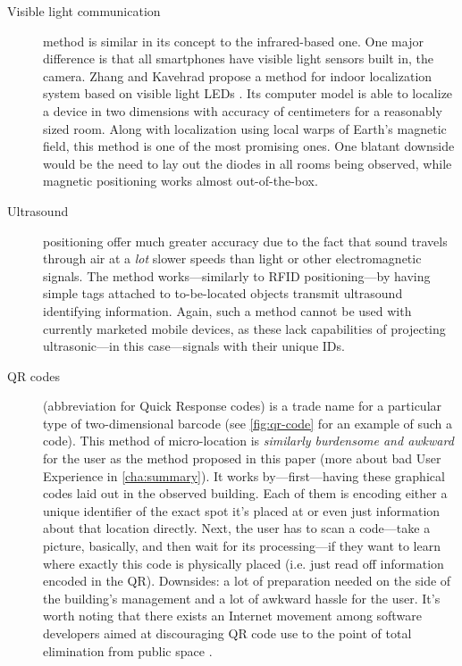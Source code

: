 \begin{description}
	\item[Visible light communication] method is similar in its concept to the infrared-based one. One major difference is that all smartphones have visible light sensors built in, the camera. Zhang and Kavehrad propose a method for indoor localization system based on visible light LEDs \cite{Zhang:visible-light}. Its computer model is able to localize a device in two dimensions with accuracy of centimeters for a reasonably sized room. Along with localization using local warps of Earth's magnetic field, this method is one of the most promising ones. One blatant downside would be the need to lay out the diodes in all rooms being observed, while magnetic positioning works almost out-of-the-box.
	
	\item[Ultrasound] positioning offer much greater accuracy due to the fact that sound travels through air at a \emph{lot} slower speeds than light or other electromagnetic signals. The method works---similarly to RFID positioning---by having simple tags attached to to-be-located objects transmit ultrasound identifying information. Again, such a method cannot be used with currently marketed mobile devices, as these lack capabilities of projecting ultrasonic---in this case---signals with their unique IDs.
	
	\item[QR codes] (abbreviation for Quick Response codes) is a trade name for a particular type of two-dimensional barcode (see \cref{fig:qr-code} for an example of such a code). This method of micro-location is \emph{similarly burdensome and awkward} for the user as the method proposed in this paper (more about bad User Experience in \cref{cha:summary}). It works by---first---having these graphical codes laid out in the observed building. Each of them is encoding either a unique identifier of the exact spot it's placed at or even just information about that location directly. Next, the user has to scan a code---take a picture, basically, and then wait for its processing---if they want to learn where exactly this code is physically placed (i.e. just read off information encoded in the QR). Downsides: a lot of preparation needed on the side of the building's management and a lot of awkward hassle for the user. It's worth noting that there exists an Internet movement among software developers aimed at discouraging QR code use to the point of total elimination from public space \cite{should-i-use-qr}.
	

\end{description}
